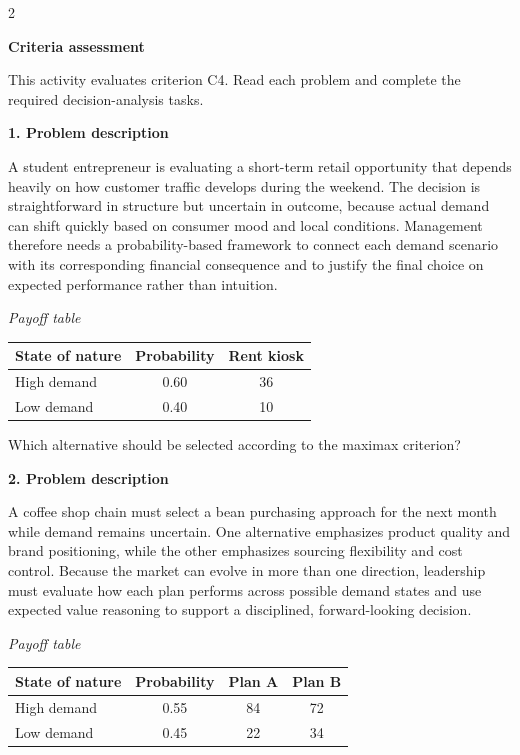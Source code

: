 \documentclass[12pt]{article}
\newcommand{\SubsectionBox}[1]{%
	\noindent\colorbox{gray!30}{%
		\parbox{\linewidth}{\textbf{#1}}%
	}\par\vspace{0.35cm}%
}
\begin{document}
	\begin{multicols}{2}
		\SubsectionBox{Criteria assessment}\vspace{-0.25cm}
		This activity evaluates criterion C4. Read each problem and complete the required decision-analysis tasks.

		\vspace{0.25cm}
		\SubsectionBox{1. Problem description}\vspace{-0.25cm}
		A student entrepreneur is evaluating a short-term retail opportunity that depends heavily on how customer traffic develops during the weekend. The decision is straightforward in structure but uncertain in outcome, because actual demand can shift quickly based on consumer mood and local conditions. Management therefore needs a probability-based framework to connect each demand scenario with its corresponding financial consequence and to justify the final choice on expected performance rather than intuition.
		
				\begin{center}
					\textit{Payoff table} \par
					\begin{tabular}{l c c}
						\toprule
						State of nature & Probability & Rent kiosk \\
						\midrule
						High demand & 0.60 & 36 \\
						Low demand & 0.40 & 10 \\
						\bottomrule
					\end{tabular}
				\end{center}
		
				Which alternative should be selected according to the maximax criterion?

		\vspace{0.25cm}
		\SubsectionBox{2. Problem description}\vspace{-0.25cm}
		A coffee shop chain must select a bean purchasing approach for the next month while demand remains uncertain. One alternative emphasizes product quality and brand positioning, while the other emphasizes sourcing flexibility and cost control. Because the market can evolve in more than one direction, leadership must evaluate how each plan performs across possible demand states and use expected value reasoning to support a disciplined, forward-looking decision.
		
				\begin{center}
					\textit{Payoff table} \par
					\begin{tabular}{l c c c}
						\toprule
						State of nature & Probability & Plan A & Plan B \\
						\midrule
						High demand & 0.55 & 84 & 72 \\
						Low demand & 0.45 & 22 & 34 \\
						\bottomrule
					\end{tabular}
				\end{center}
		

\end{multicols}
\end{document}
